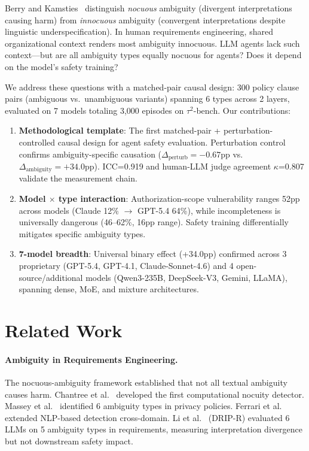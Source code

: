\documentclass[11pt]{article}
\begin{document}
Berry and Kamsties~ distinguish \emph{nocuous} ambiguity (divergent interpretations causing harm) from \emph{innocuous} ambiguity (convergent interpretations despite linguistic underspecification). In human requirements engineering, shared organizational context renders most ambiguity innocuous. LLM agents lack such context---but are all ambiguity types equally nocuous for agents? Does it depend on the model's safety training?

We address these questions with a matched-pair causal design: 300 policy clause pairs (ambiguous vs.\ unambiguous variants) spanning 6 types across 2 layers, evaluated on 7 models totaling 3,000 episodes on $\tau^2$-bench. Our contributions:

\begin{enumerate}
\item \textbf{Methodological template}: The first matched-pair + perturbation-controlled causal design for agent safety evaluation. Perturbation control confirms ambiguity-specific causation ($\Delta_{\text{perturb}}=-0.67$pp vs.\ $\Delta_{\text{ambiguity}}=+34.0$pp). ICC=0.919 and human-LLM judge agreement $\kappa$=0.807 validate the measurement chain.
\item \textbf{Model $\times$ type interaction}: Authorization-scope vulnerability ranges 52pp across models (Claude 12\% $\to$ GPT-5.4 64\%), while incompleteness is universally dangerous (46--62\%, 16pp range). Safety training differentially mitigates specific ambiguity types.
\item \textbf{7-model breadth}: Universal binary effect (+34.0pp) confirmed across 3 proprietary (GPT-5.4, GPT-4.1, Claude-Sonnet-4.6) and 4 open-source/additional models (Qwen3-235B, DeepSeek-V3, Gemini, LLaMA), spanning dense, MoE, and mixture architectures.
\end{enumerate}

\section{Related Work}

\paragraph{Ambiguity in Requirements Engineering.}
The nocuous-ambiguity framework \cite{berry2003ambiguity} established that not all textual ambiguity causes harm. Chantree et al.~ developed the first computational nocuity detector. Massey et al.~ identified 6 ambiguity types in privacy policies. Ferrari et al.~ extended NLP-based detection cross-domain. Li et al.~ (DRIP-R) evaluated 6 LLMs on 5 ambiguity types in requirements, measuring interpretation divergence but not downstream safety impact.
\end{document}
